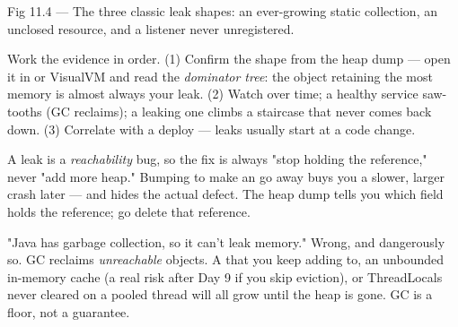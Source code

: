 \begin{wbfigure}{Fig 11.4 --- The three classic leak shapes: an ever-growing static collection, an unclosed resource, and a listener never unregistered.}
\end{wbfigure}

 Work the evidence in order. (1) Confirm the shape from the heap dump --- open it in  or VisualVM and read the \emph{dominator tree}: the object retaining the most memory is almost always your leak. (2) Watch  over time; a healthy service saw-tooths (GC reclaims); a leaking one climbs a staircase that never comes back down. (3) Correlate with a deploy --- leaks usually start at a code change.

\begin{seniornote}
A leak is a \emph{reachability} bug, so the fix is always "stop holding the reference," never "add more heap." Bumping  to make an  go away buys you a slower, larger crash later --- and hides the actual defect. The heap dump tells you which field holds the reference; go delete that reference.
\end{seniornote}

\begin{misconception}
"Java has garbage collection, so it can't leak memory." Wrong, and dangerously so. GC reclaims \emph{unreachable} objects. A  that you keep adding to, an unbounded in-memory cache (a real risk after Day 9 if you skip eviction), or ThreadLocals never cleared on a pooled thread will all grow until the heap is gone. GC is a floor, not a guarantee.
\end{misconception}

